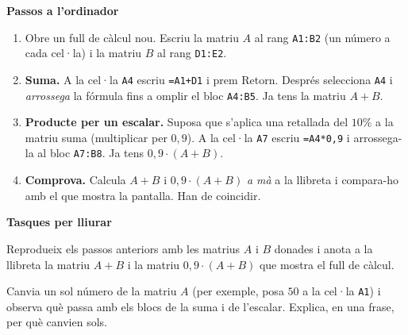 \begin{idea}
\textbf{Passos a l'ordinador}
\begin{enumerate}[leftmargin=1.8em, itemsep=3pt]
  \item Obre un full de càlcul nou. Escriu la matriu $A$ al rang \texttt{A1:B2}
        (un número a cada cel·la) i la matriu $B$ al rang \texttt{D1:E2}.
  \item \textbf{Suma.} A la cel·la \texttt{A4} escriu \texttt{=A1+D1} i prem Retorn.
        Després selecciona \texttt{A4} i \emph{arrossega} la fórmula fins a omplir
        el bloc \texttt{A4:B5}. Ja tens la matriu $A+B$.
  \item \textbf{Producte per un escalar.} Suposa que s'aplica una retallada del
        $10\%$ a la matriu suma (multiplicar per $0{,}9$). A la cel·la \texttt{A7}
        escriu \texttt{=A4*0,9} i arrossega-la al bloc \texttt{A7:B8}. Ja tens
        $0{,}9\cdot(A+B)$.
  \item \textbf{Comprova.} Calcula $A+B$ i $0{,}9\cdot(A+B)$ \emph{a mà} a la
        llibreta i compara-ho amb el que mostra la pantalla. Han de coincidir.
\end{enumerate}
\end{idea}

\textbf{Tasques per lliurar}
\begin{exercicis}
\begin{exlist}
  \item Reprodueix els passos anteriors amb les matrius $A$ i $B$ donades i
        anota a la llibreta la matriu $A+B$ i la matriu $0{,}9\cdot(A+B)$ que
        mostra el full de càlcul.
  \item Canvia un sol número de la matriu $A$ (per exemple, posa $50$ a la cel·la
        \texttt{A1}) i observa què passa amb els blocs de la suma i de l'escalar.
        Explica, en una frase, per què canvien sols.
\end{exlist}
\end{exercicis}

